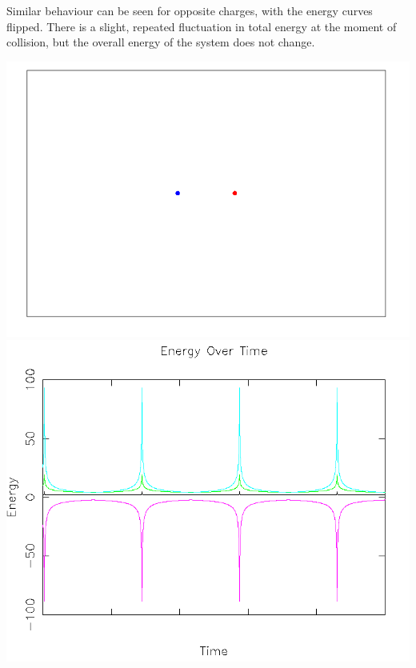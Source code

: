\documentclass{article}
\begin{document}
Similar behaviour can be seen for opposite charges, with the energy curves flipped.
There is a slight, repeated fluctuation in total energy at the moment of collision,
but the overall energy of the system does not change.
\\
\begin{center}
    \includegraphics[scale=0.5]{charged_2_opp}
    \includegraphics[scale=0.5]{charged_2_opp_energy}
\end{center}
\end{document}
